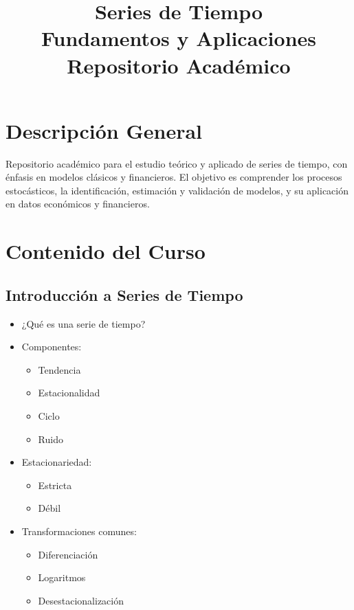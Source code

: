\documentclass[12pt, a4paper]{article}
\title{%
  \LARGE \textbf{Series de Tiempo} \\[0.4em]
  \large Fundamentos y Aplicaciones \\[0.4em]
  \normalsize Repositorio Académico
}
\author{}
\date{}
\begin{document}
\maketitle
\tableofcontents
\newpage

\section{Descripción General}

Repositorio académico para el estudio teórico y aplicado de series de tiempo,
con énfasis en modelos clásicos y financieros. El objetivo es comprender los
procesos estocásticos, la identificación, estimación y validación de modelos,
y su aplicación en datos económicos y financieros.

\section{Contenido del Curso}

\subsection{Introducción a Series de Tiempo}

\begin{itemize}
  \item ¿Qué es una serie de tiempo?
  \item Componentes:
    \begin{itemize}
      \item Tendencia
      \item Estacionalidad
      \item Ciclo
      \item Ruido
    \end{itemize}
  \item Estacionariedad:
    \begin{itemize}
      \item Estricta
      \item Débil
    \end{itemize}
  \item Transformaciones comunes:
    \begin{itemize}
      \item Diferenciación
      \item Logaritmos
      \item Desestacionalización
    \end{itemize}
\end{itemize}
\end{document}
